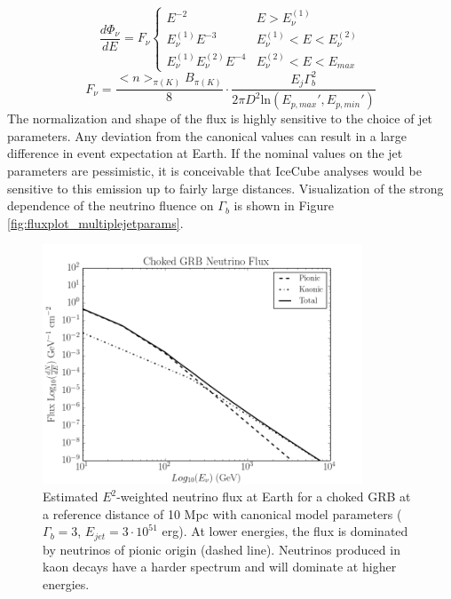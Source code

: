 \documentclass{gatech-thesis}
\begin{document}
\begin{equation}\label{eq:chkgrb_spec}
\frac{d\Phi_\nu}{dE}=F_\nu\left\{\begin{array}{cc}
E^{-2} & E > E_{\nu}^{(1)} \\ 
E_{\nu}^{(1)}E^{-3} & E_{\nu}^{(1)}< E < E_{\nu}^{(2)} \\ 
E_{\nu}^{(1)}E_{\nu}^{(2)}E^{-4} & E_{\nu}^{(2)}< E < E_{max}
\end{array}\right.
\end{equation}
\begin{equation}\label{eq:nuflu}
F_{\nu} = \frac{<n>_{\pi(K)}B_{\pi(K)}}{8} \cdot \frac{E_j \Gamma_b^2}{2 \pi D^2 \text{ln}(E_{p,max}', E_{p,min}')}
\end{equation}
The normalization and shape of the flux is highly sensitive to the choice of jet parameters. Any deviation from the canonical values can result in a large difference in event expectation at Earth. If the nominal values on the jet parameters are pessimistic, it is conceivable that IceCube analyses would be sensitive to this emission up to fairly large distances. Visualization of the strong dependence of the neutrino fluence on $\Gamma_b$ is shown in Figure \ref{fig:fluxplot_multiplejetparams}.

\begin{figure}[ht]
  \begin{center}
    \includegraphics[width=0.85\textwidth,keepaspectratio]{FluxPlot_Canonical_RespectiveFluenceNorm.png}
  \end{center}
  \caption[Choked GRB Flux at Earth by Pion and Kaon Contribution]{Estimated $E^{2}$-weighted neutrino flux at Earth for a choked GRB at a reference distance of 10 Mpc with canonical model parameters ($\Gamma_{b}=3$, $E_{jet}=3\cdot 10^{51}$ erg). At lower energies, the flux is dominated by neutrinos of pionic origin (dashed line). Neutrinos produced in kaon decays have a harder spectrum and will dominate at higher energies.}
  \label{fig:ref_chkgrb_flux}
\end{figure}
\end{document}
